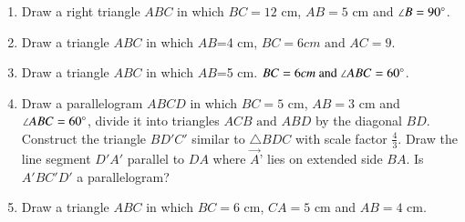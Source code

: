 \begin{enumerate}[label=\thesubsection.\arabic*,ref=\thesubsection.\theenumi]
\item Draw a right triangle ${ABC}$ in which $BC=12$ cm, $AB=5$ cm and $\angle{B}=90\degree$.
\item Draw a triangle ${ABC}$ in which $AB$=4 cm, $BC=6 cm\text{ and }AC=9$. 
\item Draw a triangle ${ABC}$ in which $AB$=5 cm. $BC=6 cm\text{ and }\angle {ABC}=60\degree$. 
\item Draw a parallelogram ${ABCD}$ in which $BC=5$ cm, $AB=3$ cm and $\angle{ABC}=60\degree$, divide it into triangles ${ACB}\text{ and }{ABD}$ by the diagonal $BD$. 
Construct the triangle $BD'C'$ similar to $\triangle{BDC}$ with scale factor $\frac{4}{3}$. Draw the line segment $D'A'$ parallel to $DA$ where $\vec{A}$' lies on extended side $BA$. Is $A'BC'D'$ a parallelogram? 
\item Draw a triangle ${ABC}$ in which $BC=6$ cm, $CA=5$ cm and $AB=4$ cm. 
\end{enumerate}
